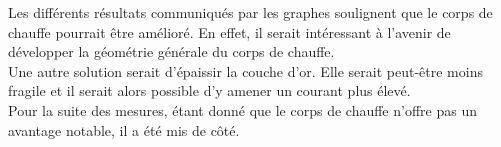 Les différents résultats communiqués par les graphes soulignent que le corps de chauffe pourrait être amélioré. En effet, il serait intéressant 
à l'avenir de développer la géométrie générale du corps de chauffe. \\
Une autre solution serait d'épaissir la couche d'or. Elle serait peut-être moins fragile et il serait alors possible d'y amener un courant plus élevé. \\

Pour la suite des mesures, étant donné que le corps de chauffe n'offre pas un avantage notable, il a été mis de côté. 

